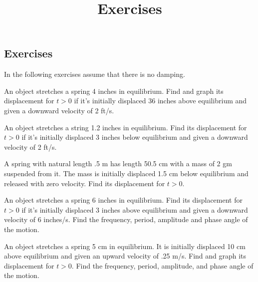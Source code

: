 \documentclass{ximera}
\title{Exercises} \license{CC BY-NC-SA 4.0}
\begin{document}
\begin{abstract}
\end{abstract}
\maketitle

\begin{onlineOnly}
\section*{Exercises}
\end{onlineOnly}

In the following exercises assume that there is no damping.

\begin{problem}\label{exer:6.1.1}
An object stretches a spring 4 inches in equilibrium.
Find and graph its displacement for $t>0$ if it's initially displaced
36 inches above equilibrium and given a downward velocity of 2 ft/s.
\end{problem}

\begin{problem}\label{exer:6.1.2}
An object  stretches a string 1.2 inches in equilibrium.
Find its displacement for $t>0$ if it's initially displaced 3 inches
below equilibrium and given a downward velocity of 2 ft/s.
\end{problem}

\begin{problem}\label{exer:6.1.3}
A spring with natural length .5 m has length 50.5 cm with a mass of 2
gm suspended from it. The mass is initially displaced 1.5 cm below
equilibrium and released with zero velocity. Find its displacement for
$t>0$.
\end{problem}

\begin{problem}\label{exer:6.1.4}
An object stretches a spring 6 inches in equilibrium. Find its
displacement for $t>0$ if it's initially displaced 3 inches above
equilibrium and given a downward velocity of 6 inches/s. Find the
frequency, period, amplitude and phase angle of the motion.
\end{problem}

\begin{problem}\label{exer:6.1.5}
An object stretches a spring 5 cm in equilibrium. It is initially
displaced 10 cm above equilibrium and given an upward velocity of .25
m/s. Find and graph its displacement for $t>0$. Find the frequency,
period, amplitude, and phase angle of the motion.
\end{problem}
\end{document}
